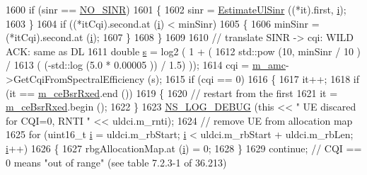 \begin{DoxyCode}
1600               \textcolor{keywordflow}{if} (sinr == \hyperlink{cqa-ff-mac-scheduler_8h_a520d71777be043568160c783a9c65fd5}{NO\_SINR})
1601                 \{
1602                   sinr = \hyperlink{classns3_1_1TdMtFfMacScheduler_af478fd46ddd6b47842306eafff354069}{EstimateUlSinr} ((*it).first, \hyperlink{bernuolliDistribution_8m_a6f6ccfcf58b31cb6412107d9d5281426}{i});
1603                 \}
1604               \textcolor{keywordflow}{if} ((*itCqi).second.at (\hyperlink{bernuolliDistribution_8m_a6f6ccfcf58b31cb6412107d9d5281426}{i}) < minSinr)
1605                 \{
1606                   minSinr = (*itCqi).second.at (\hyperlink{bernuolliDistribution_8m_a6f6ccfcf58b31cb6412107d9d5281426}{i});
1607                 \}
1608             \}
1609 
1610           \textcolor{comment}{// translate SINR -> cqi: WILD ACK: same as DL}
1611           \textcolor{keywordtype}{double} \hyperlink{generate__test__data__lte__sinr_8m_ad83eeb3a142285d1243a08c6b7026df8}{s} = log2 ( 1 + (
1612                                  std::pow (10, minSinr / 10 )  /
1613                                  ( (-std::log (5.0 * 0.00005 )) / 1.5) ));
1614           cqi = \hyperlink{classns3_1_1TdMtFfMacScheduler_a2fa1c7abd867e10a52fcd0de82dc6cc1}{m\_amc}->GetCqiFromSpectralEfficiency (s);
1615           \textcolor{keywordflow}{if} (cqi == 0)
1616             \{
1617               it++;
1618               \textcolor{keywordflow}{if} (it == \hyperlink{classns3_1_1TdMtFfMacScheduler_a06bec792095027e46fcf5281e4f4e77a}{m\_ceBsrRxed}.end ())
1619                 \{
1620                   \textcolor{comment}{// restart from the first}
1621                   it = \hyperlink{classns3_1_1TdMtFfMacScheduler_a06bec792095027e46fcf5281e4f4e77a}{m\_ceBsrRxed}.begin ();
1622                 \}
1623               \hyperlink{group__logging_ga413f1886406d49f59a6a0a89b77b4d0a}{NS\_LOG\_DEBUG} (\textcolor{keyword}{this} << \textcolor{stringliteral}{" UE discared for CQI=0, RNTI "} << uldci.m\_rnti);
1624               \textcolor{comment}{// remove UE from allocation map}
1625               \textcolor{keywordflow}{for} (uint16\_t \hyperlink{bernuolliDistribution_8m_a6f6ccfcf58b31cb6412107d9d5281426}{i} = uldci.m\_rbStart; \hyperlink{bernuolliDistribution_8m_a6f6ccfcf58b31cb6412107d9d5281426}{i} < uldci.m\_rbStart + uldci.m\_rbLen; 
      \hyperlink{bernuolliDistribution_8m_a6f6ccfcf58b31cb6412107d9d5281426}{i}++)
1626                 \{
1627                   rbgAllocationMap.at (\hyperlink{bernuolliDistribution_8m_a6f6ccfcf58b31cb6412107d9d5281426}{i}) = 0;
1628                 \}
1629               \textcolor{keywordflow}{continue}; \textcolor{comment}{// CQI == 0 means "out of range" (see table 7.2.3-1 of 36.213)}

\end{DoxyCode}
